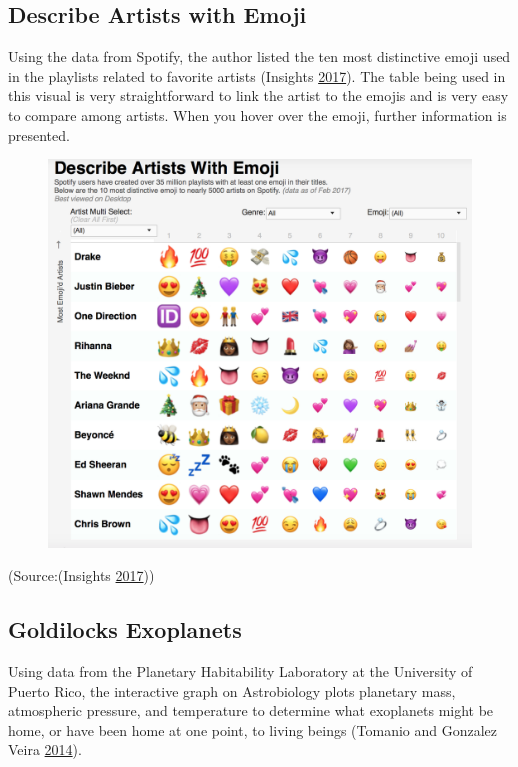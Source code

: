 \documentclass[]{book}
\begin{document}
\subsection{Describe Artists with
Emoji}\label{describe-artists-with-emoji}

Using the data from Spotify, the author listed the ten most distinctive
emoji used in the playlists related to favorite artists (Insights
\protect\hyperlink{ref-artist_emoji}{2017}). The table being used in
this visual is very straightforward to link the artist to the emojis and
is very easy to compare among artists. When you hover over the emoji,
further information is presented.

\begin{figure}
\centering
\includegraphics{images/artist_emoji.png}
\caption{}
\end{figure}

(Source:(Insights \protect\hyperlink{ref-artist_emoji}{2017}))

\subsection{Goldilocks Exoplanets}\label{goldilocks-exoplanets}

Using data from the Planetary Habitability Laboratory at the University
of Puerto Rico, the interactive graph on Astrobiology plots planetary
mass, atmospheric pressure, and temperature to determine what exoplanets
might be home, or have been home at one point, to living beings (Tomanio
and Gonzalez Veira \protect\hyperlink{ref-goldilocks_worlds}{2014}).
\end{document}
